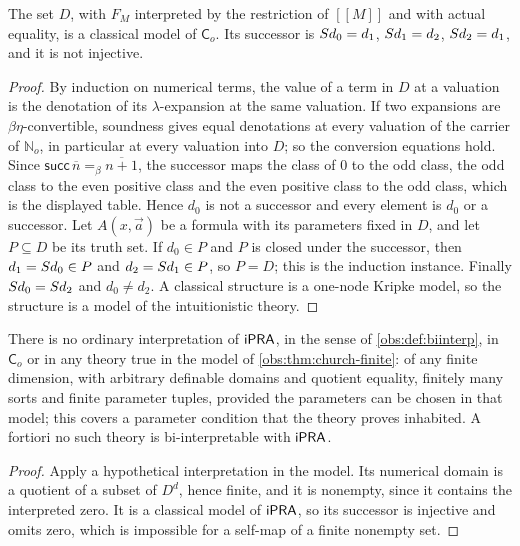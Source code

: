 \begin{theorem}
\label{obs:thm:church-finite}
The set $D$, with $F_M$ interpreted by the restriction of $[\![M]\!]$ and with
actual equality, is a classical model of $\mathsf{C}_o$. Its successor is
$S d_0=d_1$, $S d_1=d_2$, $S d_2=d_1$, and it is not injective.
\end{theorem}

\begin{proof}
By induction on numerical terms, the value of a term in $D$ at a valuation is
the denotation of its $\lambda$-expansion at the same valuation. If two
expansions are $\beta\eta$-convertible, soundness gives equal denotations at
every valuation of the carrier of $\mathbb{N}_o$, in particular at every
valuation into $D$; so the conversion equations hold. Since
$\mathsf{succ}\,\overline{n}=_{\beta}\overline{n+1}$, the successor maps the
class of $0$ to the odd class, the odd class to the even positive class and
the even positive class to the odd class, which is the displayed table. Hence
$d_0$ is not a successor and every element is $d_0$ or a successor. Let
$A(x,\vec a)$ be a formula with its parameters fixed in $D$, and let
$P\subseteq D$ be its truth set. If $d_0\in P$ and $P$ is closed under the
successor, then $d_1=S d_0\in P$ and $d_2=S d_1\in P$, so $P=D$; this is
the induction instance. Finally $S d_0=S d_2$ and $d_0\ne d_2$. A
classical structure is a one-node Kripke model, so the structure is a model of
the intuitionistic theory.
\end{proof}

\begin{corollary}
\label{obs:cor:church-nointerp}
There is no ordinary interpretation of $\mathsf{iPRA}$, in the sense of
\cref{obs:def:biinterp}, in $\mathsf{C}_o$ or in any theory true in the model
of \cref{obs:thm:church-finite}: of any finite dimension, with arbitrary
definable domains and quotient equality, finitely many sorts and finite
parameter tuples, provided the parameters can be chosen in that model; this
covers a parameter condition that the theory proves inhabited. A fortiori no
such theory is bi-interpretable with $\mathsf{iPRA}$.
\end{corollary}

\begin{proof}
Apply a hypothetical interpretation in the model. Its numerical domain is a
quotient of a subset of $D^{d}$, hence finite, and it is nonempty, since it
contains the interpreted zero. It is a classical model of $\mathsf{iPRA}$, so its
successor is injective and omits zero, which is impossible for a self-map of a
finite nonempty set.
\end{proof}

